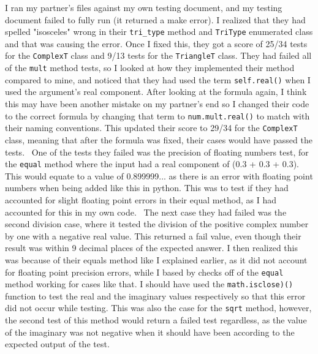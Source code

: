 \documentclass[12pt]{article}
\begin{document}
I ran my partner's files against my own testing document, and my testing document 
failed to fully run (it returned a make error). I realized that they had spelled 
"isosceles" wrong in their \verb|tri_type| method and \verb|TriType| enumerated 
class and that was causing the error. Once I fixed this, they got a score of 25/34 
tests for the \verb|ComplexT| class and 9/13 tests for the \verb|TriangleT| class. 
They had failed all of the \verb|mult| method tests, so I looked at how they 
implemented their method compared to mine, and noticed that they had used the 
term \verb|self.real()| when I used the argument's real component. After looking 
at the formula again, I think this may have been another mistake on my partner's 
end so I changed their code to the correct formula by changing that term to 
\verb|num.mult.real()| to match with their naming conventions. This updated 
their score to 29/34 for the \verb|ComplexT| class, meaning that after the 
formula was fixed, their cases would have passed the tests. 
~\newline\noindent One of the tests they failed was the precision of floating 
numbers test, for the \verb|equal| method where the input had a real component 
of (0.3 + 0.3 + 0.3). This would equate to a value of 0.899999... as there is 
an error with floating point numbers when being added like this in python. 
This was to test if they had accounted for slight floating point errors in 
their equal method, as I had accounted for this in my own code. 
~\newline\noindent The next case they had failed was the second division case, 
where it tested the division of the positive complex number by one with a 
negative real value. This returned a fail value, even though their result was
 within 9 decimal places of the expected answer. I then realized this was 
 because of their equals method like I explained earlier, as it did not account 
 for floating point precision errors, while I based by checks off of the 
 \verb|equal| method working for cases like that. I should have used the 
 \verb|math.isclose)()| function to test the real and the imaginary values 
 respectively so that this error did not occur while testing. This was also 
 the case for the \verb|sqrt| method, however, the second test of this method 
 would return a failed test regardless, as the value of the imaginary was not 
 negative when it should have been according to the expected output of the test.
\end{document}
